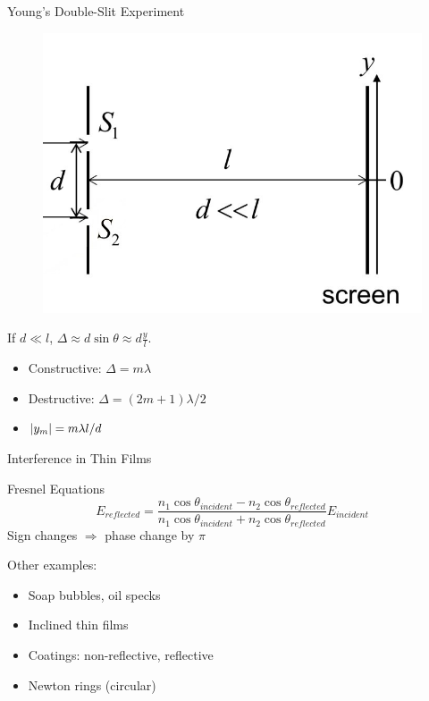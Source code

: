 \documentclass{beamer}
\begin{document}
\begin{frame}{Young's Double-Slit Experiment}
    \begin{figure}[htbp]
        \centering
        \includegraphics[height=0.5\textheight]{images/young.jpg}
    \end{figure}

    If $d\ll l$, $\Delta \approx d\sin\theta \approx d \frac{y}{l}$.
    \begin{itemize}
        \item Constructive: $\Delta=m\lambda$
        \item Destructive: $\Delta= (2m+1)\lambda/2$
        \item $\abs{y_m} = m\lambda l/d$
    \end{itemize}
\end{frame}

\begin{frame}{Interference in Thin Films}
    \begin{beamerboxesrounded}[shadow=true]{Fresnel Equations}
        \begin{equation}
            E_{reflected} = \frac{n_1\cos\theta_{incident}-n_2\cos\theta_{reflected}}{n_1\cos\theta_{incident}+n_2\cos\theta_{reflected}} E_{incident}
        \end{equation}
        Sign changes $\Rightarrow$ phase change by $\pi$
    \end{beamerboxesrounded}
    \vspace{.5em}
    Other examples:
    \begin{itemize}
        \item Soap bubbles, oil specks
        \item Inclined thin films
        \item Coatings: non-reflective, reflective
        \item Newton rings (circular)
    \end{itemize}
\end{frame}
\end{document}

